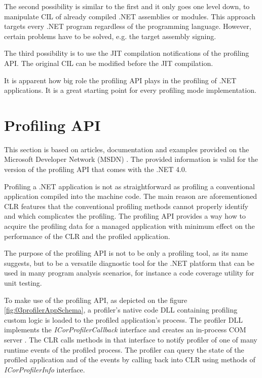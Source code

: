 The second possibility is similar to the first and it only goes one level down, to manipulate CIL of already compiled .NET assemblies or modules. This approach targets every .NET program regardless of the programming language. However, certain problems have to be solved, e.g. the target assembly signing.

The third possibility is to use the JIT compilation notifications of the profiling API. The original CIL can be modified before the JIT compilation.

It is apparent how big role the profiling API plays in the profiling of .NET applications. It is a great starting point for every profiling mode implementation.

\section{Profiling API}
This section is based on articles, documentation and examples provided on the Microsoft Developer Network (MSDN) \cite{ProfMSDN}. The provided information is valid for the version of the profiling API that comes with the .NET 4.0. 

Profiling a .NET application is not as straightforward as profiling a conventional application compiled into the machine code. The main reason are aforementioned CLR features that the conventional profiling methods cannot properly identify and which complicates the profiling. The profiling API provides a way how to acquire the profiling data for a managed application with minimum effect on the performance of the CLR and the profiled application. 

The purpose of the profiling API is not to be only a profiling tool, as its name suggests, but to be a versatile diagnostic tool for the .NET platform that can be used in many program analysis scenarios, for instance a code coverage utility for unit testing.

To make use of the profiling API, as depicted on the figure \ref{fig:03profilerAppSchema}, a profiler's native code DLL containing profiling custom logic is loaded to the profiled application's process. The profiler DLL implements the \textit{ICorProfilerCallback} interface and creates an in-process COM server . The CLR calls methods in that interface to notify profiler of one of many runtime events of the profiled process. The profiler can query the state of the profiled application and of the events by calling back into CLR using methods of \textit{ICorProfilerInfo} interface.

